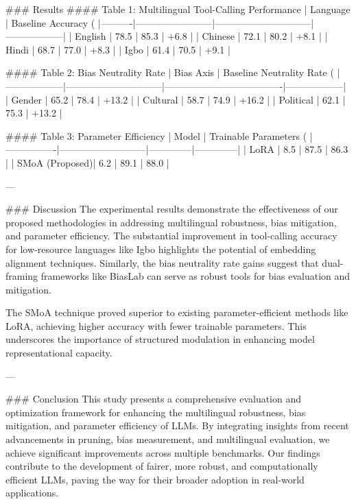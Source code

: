 ### Results
#### Table 1: Multilingual Tool-Calling Performance
| Language | Baseline Accuracy (%
|----------|------------------------|------------------------------|------------------|
| English  | 78.5                  | 85.3                        | +6.8            |
| Chinese  | 72.1                  | 80.2                        | +8.1            |
| Hindi    | 68.7                  | 77.0                        | +8.3            |
| Igbo     | 61.4                  | 70.5                        | +9.1            |

#### Table 2: Bias Neutrality Rate
| Bias Axis        | Baseline Neutrality Rate (%
|------------------|------------------------------|-------------------------------------|------------------|
| Gender           | 65.2                        | 78.4                               | +13.2           |
| Cultural          | 58.7                        | 74.9                               | +16.2           |
| Political         | 62.1                        | 75.3                               | +13.2           |

#### Table 3: Parameter Efficiency
| Model          | Trainable Parameters (%
|----------------|---------------------------|--------------|--------------|
| LoRA           | 8.5                       | 87.5         | 86.3         |
| SMoA (Proposed)| 6.2                       | 89.1         | 88.0         |

---

### Discussion
The experimental results demonstrate the effectiveness of our proposed methodologies in addressing multilingual robustness, bias mitigation, and parameter efficiency. The substantial improvement in tool-calling accuracy for low-resource languages like Igbo highlights the potential of embedding alignment techniques. Similarly, the bias neutrality rate gains suggest that dual-framing frameworks like BiasLab can serve as robust tools for bias evaluation and mitigation.

The SMoA technique proved superior to existing parameter-efficient methods like LoRA, achieving higher accuracy with fewer trainable parameters. This underscores the importance of structured modulation in enhancing model representational capacity.

---

### Conclusion
This study presents a comprehensive evaluation and optimization framework for enhancing the multilingual robustness, bias mitigation, and parameter efficiency of LLMs. By integrating insights from recent advancements in pruning, bias measurement, and multilingual evaluation, we achieve significant improvements across multiple benchmarks. Our findings contribute to the development of fairer, more robust, and computationally efficient LLMs, paving the way for their broader adoption in real-world applications.

